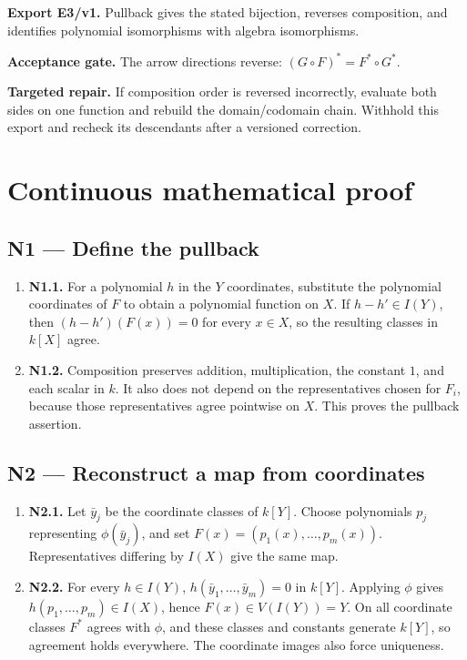 \documentclass[preprint,12pt,aps,pra,showkeys,amsmath,amssymb,superscriptaddress,floatfix]{revtex4-2}
\theoremstyle{definition}
\theoremstyle{remark}
\newcommand{\field}[2]{\par\smallskip\noindent\textbf{#1.} #2\par}
\begin{document}
\field{Export E3/v1}{Pullback gives the stated bijection, reverses composition, and
identifies polynomial isomorphisms with algebra isomorphisms.}

\field{Acceptance gate}{The arrow directions reverse: \((G\circ F)^*=F^*\circ G^*\).}

\field{Targeted repair}{If composition order is reversed incorrectly, evaluate both sides on one
function and rebuild the domain/codomain chain. Withhold this export and
recheck its descendants after a versioned correction.}

\endgroup\clearpage\section{Continuous mathematical proof}\label{sec:proof}

\subsection{N1 --- Define the pullback}\label{n1-define-the-pullback}

\begin{enumerate}
\def\labelenumi{\arabic{enumi}.}
\item
  \textbf{N1.1.} For a polynomial \(h\) in the \(Y\) coordinates,
  substitute the polynomial coordinates of \(F\) to obtain a polynomial
  function on \(X\). If \(h-h'\in I(Y)\), then \((h-h')(F(x))=0\) for
  every \(x\in X\), so the resulting classes in \(k[X]\) agree.
\item
  \textbf{N1.2.} Composition preserves addition, multiplication, the
  constant \(1\), and each scalar in \(k\). It also does not depend on
  the representatives chosen for \(F_i\), because those representatives
  agree pointwise on \(X\). This proves the pullback assertion.
\end{enumerate}

\subsection{N2 --- Reconstruct a map from
coordinates}\label{n2-reconstruct-a-map-from-coordinates}

\begin{enumerate}
\def\labelenumi{\arabic{enumi}.}
\item
  \textbf{N2.1.} Let \(\bar y_j\) be the coordinate classes of \(k[Y]\).
  Choose polynomials \(p_j\) representing \(\phi(\bar y_j)\), and set
  \(F(x)=(p_1(x),\ldots,p_m(x))\). Representatives differing by \(I(X)\)
  give the same map.
\item
  \textbf{N2.2.} For every \(h\in I(Y)\),
  \(h(\bar y_1,\ldots,\bar y_m)=0\) in \(k[Y]\). Applying \(\phi\) gives
  \(h(p_1,\ldots,p_m)\in I(X)\), hence \(F(x)\in V(I(Y))=Y\). On all
  coordinate classes \(F^*\) agrees with \(\phi\), and these classes and
  constants generate \(k[Y]\), so agreement holds everywhere. The
  coordinate images also force uniqueness.
\end{enumerate}
\end{document}

